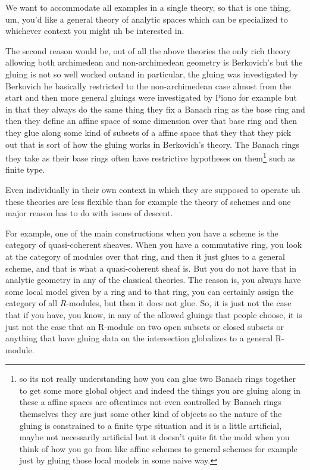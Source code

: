 \begin{answer}
    
        We want to accommodate all examples in a single theory, so that is  one thing, um, you'd like a general theory of 
        analytic spaces which can be specialized to whichever context you might uh be interested in.

        
        The second reason would be, out of all the above theories the only rich theory allowing both 
        archimedean and non-archimedean geometry is Berkovich's but the gluing is not so well worked outand in particular, 
        the gluing was investigated by Berkovich he basically restricted to the non-archimedean case almost from the start 
        and then more general gluings were investigated by Piono \citeme{} for example but in that they always do the same thing 
        they fix a Banach ring as the base ring and then they define an affine space of some dimension over that base ring and 
        then they glue along some kind of subsets of a affine space that they that they pick out that is  sort of how the
         gluing works in Berkovich's theory. The Banach rings they take as their base rings often have restrictive 
         hypotheses on them\footnote{so its not really understanding how you can glue two Banach rings together to get 
         some more global object and indeed the things you are gluing along in these a affine spaces are oftentimes not even 
         controlled by Banach rings themselves they are  just some other kind of objects so the nature of the gluing is constrained 
         to a finite type situation and it is a little artificial, maybe not necessarily artificial but it doesn't quite fit 
         the mold when you think of how you go from like affine schemes to general schemes for example just by gluing those 
         local models in some naive way.} such as finite type.

        
         Even individually in their own context in which they are  supposed to operate uh these theories are less 
         flexible than for example the theory of schemes and one major reason has to do with issues of descent.

\end{answer}

For example, one of the main constructions when you have a scheme is the category of quasi-coherent sheaves. When you have a 
commutative ring, you look at the category of modules over that ring, and then it just glues to a general scheme, and that is what 
a quasi-coherent sheaf is. But you do not have that in analytic geometry in any of the classical theories. The reason is, you always 
have some local model given by a ring and to that ring, you can certainly assign the category of all $R$-modules, but then it does 
not glue. So, it is just not the case that if you have, you know, in any of the allowed gluings that people choose, it is just not 
the case that an R-module on two open subsets or closed subsets or anything that have gluing data on the intersection globalizes 
to a general R-module.

